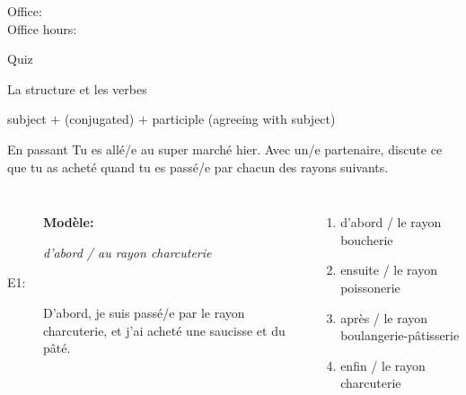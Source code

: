 \documentclass{beamer}
\subtitle[Passé composé (\lexi{être}) et rayons]{Le passé composé avec \lexi{être} et des rayons}
\begin{document}
  \begin{frame}
    \titlepage
    \tiny{Office: \\
          Office hours: }
  \end{frame}

  \begin{frame}{}
    \begin{center}
      \Large Quiz
    \end{center}
  \end{frame}

  \begin{frame}{La structure et les verbes}
    \begin{center}
      subject $+$  (conjugated) $+$ participle (agreeing with subject)
    \end{center}
  \end{frame}

  \begin{frame}{En passant}
    Tu es allé/e au super marché hier.
    Avec un/e partenaire, discute ce que tu as acheté quand tu es passé/e par chacun des rayons suivants. \\
    \begin{columns}
        \begin{description}
          \item[] \textbf{Modèle:}
          \item[] \emph{d'abord / au rayon charcuterie}
          \item[E1:] D'abord, je suis passé/e par le rayon charcuterie, et j'ai acheté une saucisse et du pâté.
          \item[] 
        \end{description}
        \begin{enumerate}
          \item d'abord / le rayon boucherie
          \item ensuite / le rayon poissonerie
          \item après / le rayon boulangerie-pâtisserie
          \item enfin / le rayon charcuterie
        \end{enumerate}
    \end{columns}
  \end{frame}
\end{document}

